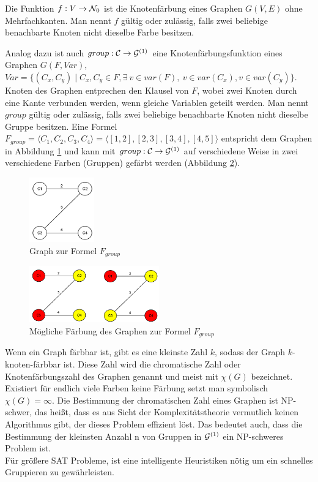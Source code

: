   \begin{definition}
  Die Funktion $f: V \rightarrow {\cal N}_0$ ist die
  Knotenfärbung eines Graphen $G(V,E)$ ohne
  Mehrfachkanten. Man nennt $f$ gültig oder zulässig,
  falls zwei beliebige benachbarte Knoten nicht
  dieselbe Farbe besitzen. 
  \end{definition}
  Analog dazu ist auch 
  $group: {\cal C} \rightarrow {\cal G}^{(1)}$ eine
  Knotenfärbungsfunktion eines Graphen $G(F, Var)$,
  $Var = \{(C_x,C_y)\mid C_x, C_y \in F, \exists\ v \in var(F),\ v \in var(C_x), v \in var(C_y)\}$.
  Knoten des Graphen entprechen den Klausel von $F$,
  wobei zwei Knoten durch eine Kante verbunden 
  werden, wenn gleiche Variablen geteilt werden.
  Man nennt $group$ gültig oder zulässig,
  falls zwei beliebige benachbarte Knoten nicht
  dieselbe Gruppe besitzen. 
  Eine Formel $F_{group} = \langle C_1, C_2, C_3,C_4 \rangle =  \langle[1,2],[2,3],[3,4],[4,5]\rangle$
  entspricht dem Graphen in Abbildung \ref{formula}
  und kann mit $group: {\cal C} \rightarrow {\cal G}^{(1)}$
  auf verschiedene Weise in zwei verschiedene Farben
  (Gruppen) gefärbt werden (Abbildung \ref{formula_colored}).
  \begin{figure}[h]
    \centering
    \includegraphics[width=0.25\textwidth]{abb/formula_graph.png}
    \caption{Graph zur Formel $F_{group}$}
    \label{formula}
  \end{figure}
   \begin{figure}[h]
    \centering
    \includegraphics[width=0.5\textwidth]{abb/formula_graph_colored.png}
    \caption{Mögliche Färbung des Graphen zur Formel $F_{group}$}
    \label{formula_colored}
  \end{figure}
  Wenn ein Graph färbbar ist, gibt es eine kleinste
  Zahl $k$, sodass der Graph $k$-knoten-färbbar ist. 
  Diese Zahl wird die chromatische Zahl oder
  Knotenfärbungszahl des Graphen genannt und meist mit 
  $\chi(G)$ bezeichnet. Existiert für endlich viele
  Farben keine Färbung setzt man symbolisch $\chi(G)=\infty$.
  Die Bestimmung der chromatischen Zahl eines Graphen ist
  NP-schwer, das heißt, dass es aus Sicht der Komplexitätstheorie 
  vermutlich keinen Algorithmus gibt, der dieses Problem 
  effizient löst. Das bedeutet auch, dass die Bestimmung der
  kleinsten Anzahl n von Gruppen in ${\cal G}^{(1)}$ ein
  NP-schweres Problem ist.\\
  Für größere SAT Probleme, ist eine 
  intelligente Heuristiken nötig um ein schnelles Gruppieren
  zu gewährleisten.


